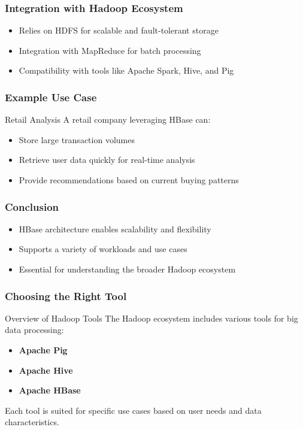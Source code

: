 \documentclass[aspectratio=169]{beamer}
\begin{document}
\begin{frame}[fragile]
    \frametitle{Integration with Hadoop Ecosystem}
    \begin{itemize}
        \item Relies on HDFS for scalable and fault-tolerant storage
        \item Integration with MapReduce for batch processing
        \item Compatibility with tools like Apache Spark, Hive, and Pig
    \end{itemize}
\end{frame}

\begin{frame}[fragile]
    \frametitle{Example Use Case}
    \begin{block}{Retail Analysis}
        A retail company leveraging HBase can:
        \begin{itemize}
            \item Store large transaction volumes
            \item Retrieve user data quickly for real-time analysis
            \item Provide recommendations based on current buying patterns
        \end{itemize}
    \end{block}
\end{frame}

\begin{frame}[fragile]
    \frametitle{Conclusion}
    \begin{itemize}
        \item HBase architecture enables scalability and flexibility
        \item Supports a variety of workloads and use cases
        \item Essential for understanding the broader Hadoop ecosystem
    \end{itemize}
\end{frame}

\begin{frame}
    \frametitle{Choosing the Right Tool}
    \begin{block}{Overview of Hadoop Tools}
        The Hadoop ecosystem includes various tools for big data processing:
        \begin{itemize}
            \item \textbf{Apache Pig}
            \item \textbf{Apache Hive}
            \item \textbf{Apache HBase}
        \end{itemize}
        Each tool is suited for specific use cases based on user needs and data characteristics.
    \end{block}
\end{frame}
\end{document}
